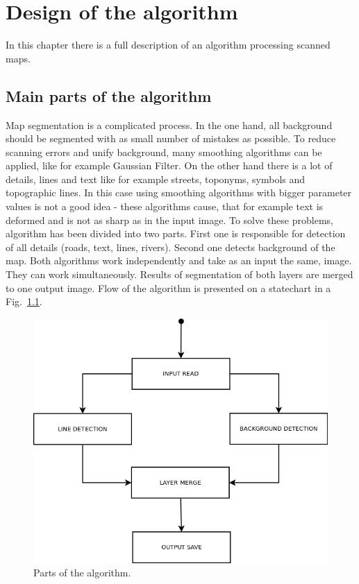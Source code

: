 \documentclass[a4paper,onecolumn,oneside,12pt]{memoir}
\begin{document}
\chapter{Design of the algorithm}

In this chapter there is a full description of an algorithm processing scanned maps.

\section{Main parts of the algorithm}

Map segmentation is a complicated process. In the one hand, all background should be segmented with
as small number of mistakes as possible. To reduce scanning errors and unify background, many 
smoothing algorithms can be applied, like for example Gaussian Filter. On the other hand there is a
lot of details, lines and text like for example streets, toponyms, symbols and topographic lines.
In this case using smoothing algorithms with bigger parameter values is not a good idea - these
algorithms cause, that for example text is deformed and is not as sharp as in the input image. To
solve these problems, algorithm has been divided into two parts. First one is responsible for
detection of all details (roads, text, lines, rivers). Second one detects background of the map. Both
algorithms work independently and take as an input the same, image. They can work simultaneously.
Results of segmentation of both layers are merged to one output image. Flow of the algorithm is
presented on a statechart in a Fig.~\ref{algorithmParts}.

\begin{figure}[!ht]
\begin{center}
\includegraphics[scale=0.5]{images/allAlgorithmParts.png}
\caption{Parts of the algorithm.}
\label{algorithmParts}
\end{center}
\end{figure}
\end{document}
